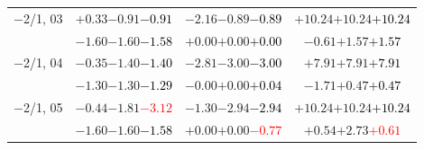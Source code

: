 \documentclass[compress]{beamer}
\begin{document}
\begin{frame}
\begin{tabular}{r | c | c | c}
$-$2/1, 03 & $+0.33$\hspace{0.1 cm}$-0.91$\hspace{0.1 cm}\textcolor{black}{$-0.91$} & $-2.16$\hspace{0.1 cm}$-0.89$\hspace{0.1 cm}\textcolor{black}{$-0.89$} & $+10.24$\hspace{0.1 cm}$+10.24$\hspace{0.1 cm}\textcolor{black}{$+10.24$} \\
           & $-1.60$\hspace{0.1 cm}$-1.60$\hspace{0.1 cm}\textcolor{black}{$-1.58$} & $+0.00$\hspace{0.1 cm}$+0.00$\hspace{0.1 cm}\textcolor{black}{$+0.00$} & $-0.61$\hspace{0.1 cm}$+1.57$\hspace{0.1 cm}\textcolor{black}{$+1.57$} \\
$-$2/1, 04 & $-0.35$\hspace{0.1 cm}$-1.40$\hspace{0.1 cm}\textcolor{black}{$-1.40$} & $-2.81$\hspace{0.1 cm}$-3.00$\hspace{0.1 cm}\textcolor{black}{$-3.00$} & $+7.91$\hspace{0.1 cm}$+7.91$\hspace{0.1 cm}\textcolor{black}{$+7.91$} \\
           & $-1.30$\hspace{0.1 cm}$-1.30$\hspace{0.1 cm}\textcolor{black}{$-1.29$} & $-0.00$\hspace{0.1 cm}$+0.00$\hspace{0.1 cm}\textcolor{black}{$+0.04$} & $-1.71$\hspace{0.1 cm}$+0.47$\hspace{0.1 cm}\textcolor{black}{$+0.47$} \\
$-$2/1, 05 & $-0.44$\hspace{0.1 cm}$-1.81$\hspace{0.1 cm}\textcolor{red}{$-3.12$} & $-1.30$\hspace{0.1 cm}$-2.94$\hspace{0.1 cm}\textcolor{black}{$-2.94$} & $+10.24$\hspace{0.1 cm}$+10.24$\hspace{0.1 cm}\textcolor{black}{$+10.24$} \\
           & $-1.60$\hspace{0.1 cm}$-1.60$\hspace{0.1 cm}\textcolor{black}{$-1.58$} & $+0.00$\hspace{0.1 cm}$+0.00$\hspace{0.1 cm}\textcolor{red}{$-0.77$} & $+0.54$\hspace{0.1 cm}$+2.73$\hspace{0.1 cm}\textcolor{red}{$+0.61$} \\

\end{tabular}
\end{frame}
\end{document}
